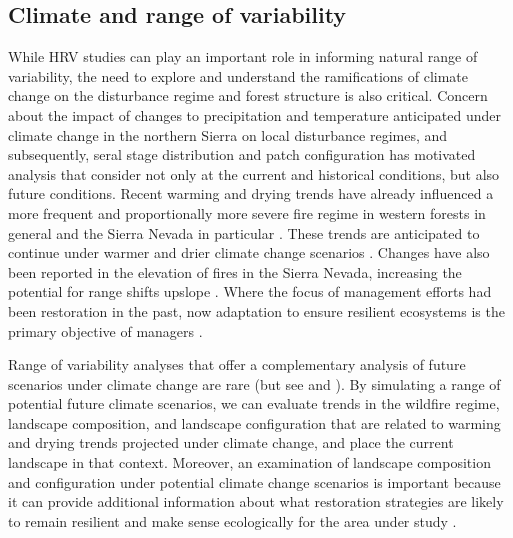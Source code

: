 
\subsection{Climate and range of variability}

While HRV studies can play an important role in informing natural range of variability, the need to explore and understand the ramifications of climate change on the disturbance regime and forest structure is also critical. Concern about the impact of changes to precipitation and temperature anticipated under climate change in the northern Sierra on local disturbance regimes, and subsequently, seral stage distribution and patch configuration has motivated analysis that consider not only at the current and historical conditions, but also future conditions\citep{Fule2008,North2012}.
%
Recent warming and drying trends have already influenced a more frequent and proportionally more severe fire regime in western forests in general and the Sierra Nevada in particular \citep{McKenzie2004,Westerling2011,Miller2012}. These trends are anticipated to continue under warmer and drier climate change scenarios \citep{Westerling2008,Dale2001}. Changes have also been reported in the elevation of fires in the Sierra Nevada, increasing the potential for range shifts upslope \citep{Schwartz2015}. Where the focus of management efforts had been restoration in the past, now adaptation to ensure resilient ecosystems is the primary objective of managers \citep{Stephens2010}.

Range of variability analyses that offer a complementary analysis of future scenarios under climate change are rare (but see \cite{Keane2008} and \cite{Duveneck2014}). By simulating a range of potential future climate scenarios, we can evaluate trends in the wildfire regime, landscape composition, and landscape configuration that are related to warming and drying trends projected under climate change, and place the current landscape in that context. Moreover, an examination of landscape composition and configuration under potential climate change scenarios is important because it can provide additional information about what restoration strategies are likely to remain resilient and make sense ecologically for the area under study \citep{Duncan2010}.

